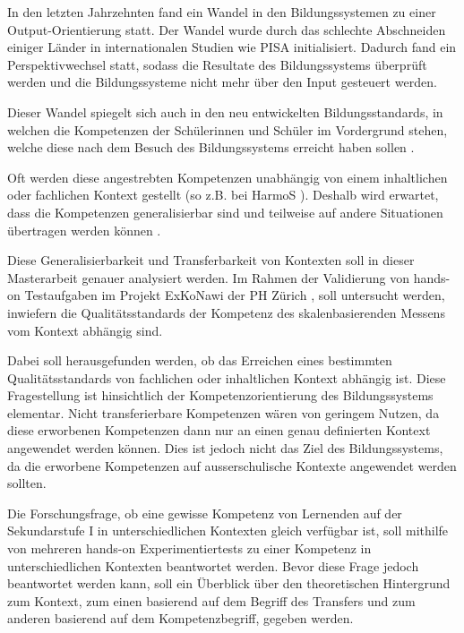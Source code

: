 

In den letzten Jahrzehnten fand ein Wandel in den Bildungssystemen zu einer Output-Orientierung statt. Der Wandel wurde durch das schlechte Abschneiden einiger Länder in internationalen Studien wie PISA \citep{PISA-KonsortiumDeuschland2004} initialisiert. Dadurch fand ein Perspektivwechsel statt, sodass die Resultate des Bildungssystems überprüft werden und die Bildungssysteme nicht mehr über den Input gesteuert werden.

Dieser Wandel spiegelt sich auch in den neu entwickelten Bildungsstandards, in welchen die Kompetenzen der Schülerinnen und Schüler im Vordergrund stehen, welche diese nach dem Besuch des Bildungssystems erreicht haben sollen \citep{Oelkers2008}.

Oft werden diese angestrebten Kompetenzen unabhängig von einem inhaltlichen oder fachlichen Kontext gestellt (so z.B. bei HarmoS \citet{KonsotriumHarmoSNaturwissenschaften+2010}). Deshalb wird erwartet, dass die Kompetenzen generalisierbar sind und teilweise auf andere Situationen übertragen werden können \citep{Hartig2006}.

Diese Generalisierbarkeit und Transferbarkeit von Kontexten soll in dieser Masterarbeit genauer analysiert werden. Im Rahmen der Validierung von hands-on Testaufgaben im Projekt ExKoNawi der PH Zürich \citep{Metzger2013}, soll untersucht werden, inwiefern die Qualitätsstandards der Kompetenz des skalenbasierenden Messens vom Kontext abhängig sind. 

Dabei soll herausgefunden werden, ob das Erreichen eines bestimmten Qualitätsstandards von fachlichen oder inhaltlichen Kontext abhängig ist. Diese Fragestellung ist hinsichtlich der Kompetenzorientierung des Bildungssystems elementar.  Nicht transferierbare Kompetenzen wären von geringem Nutzen, da diese erworbenen Kompetenzen dann nur an einen genau definierten Kontext angewendet werden können. Dies ist jedoch nicht das Ziel des Bildungssystems, da die erworbene Kompetenzen auf ausserschulische Kontexte angewendet werden sollten.

Die Forschungsfrage, ob eine gewisse Kompetenz  von Lernenden auf der Sekundarstufe I in unterschiedlichen Kontexten gleich verfügbar ist, soll mithilfe von mehreren hands-on Experimentiertests zu einer Kompetenz in unterschiedlichen Kontexten beantwortet werden. Bevor diese Frage jedoch beantwortet werden kann, soll ein Überblick über den theoretischen Hintergrund zum Kontext, zum einen basierend auf dem Begriff des Transfers und zum anderen basierend auf dem Kompetenzbegriff, gegeben werden.









